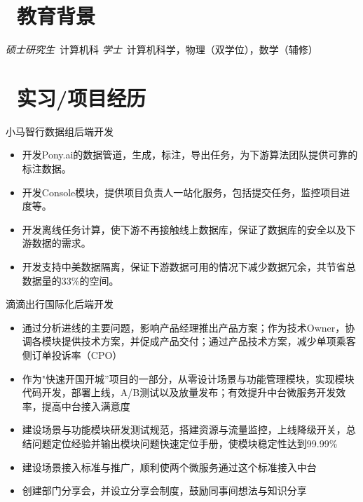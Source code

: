 \documentclass{resume}
\begin{document}


 
\section{\faGraduationCap\  教育背景}
\textit{硕士研究生}\ 计算机科
\textit{学士}\ 计算机科学，物理（双学位），数学（辅修）

\section{\faUsers\ 实习/项目经历}
\role{软件开发工程师}{工作经历}
小马智行数据组后端开发
\begin{itemize}
  \item 开发Pony.ai的数据管道，生成，标注，导出任务，为下游算法团队提供可靠的标注数据。
  \item 开发Console模块，提供项目负责人一站化服务，包括提交任务，监控项目进度等。
  \item 开发离线任务计算，使下游不再接触线上数据库，保证了数据库的安全以及下游数据的需求。
  \item 开发支持中美数据隔离，保证下游数据可用的情况下减少数据冗余，共节省总数据量的33\%的空间。
\end{itemize}

滴滴出行国际化后端开发
\begin{itemize}
  \item 通过分析进线的主要问题，影响产品经理推出产品方案；作为技术Owner，协调各模块提供技术方案，并促成产品交付；通过产品技术方案，减少单项乘客侧订单投诉率（CPO）
  \item 作为"快速开国开城”项目的一部分，从零设计场景与功能管理模块，实现模块代码开发，部署上线，A/B测试以及放量发布；有效提升中台微服务开发效率，提高中台接入满意度
  \item 建设场景与功能模块研发测试规范，搭建资源与流量监控，上线降级开关，总结问题定位经验并输出模块问题快速定位手册，使模块稳定性达到99.99\%
  \item 建设场景接入标准与推广，顺利使两个微服务通过这个标准接入中台
  \item 创建部门分享会，并设立分享会制度，鼓励同事间想法与知识分享
\end{itemize}
\end{document}
